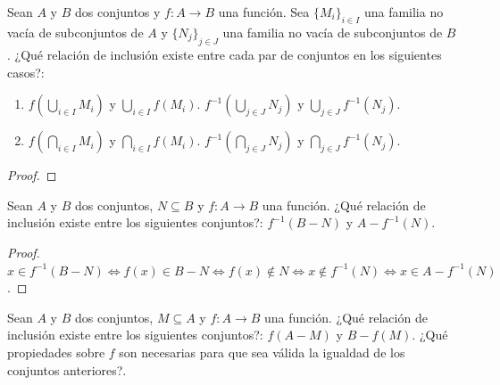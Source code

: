 \documentclass{article}
\theoremstyle{definition}
\newenvironment{ejercicio}[1]{\begin{trivlist}
\item[\hskip \labelsep {\bfseries Ejercicio}\hskip \labelsep {\bfseries #1.}]}{\end{trivlist}}
\begin{document}
\begin{ejercicio}{2}
    Sean \(A\) y \(B\) dos conjuntos y \( f:A\rightarrow B\) una función. Sea \( {\{M_{i}\}}_{i\in I} \) una familia no vacía de subconjuntos de \(A\) y \( {\{N_{j}\}}_{j\in J} \) una familia no vacía de subconjuntos de \(B\). ¿Qué relación de inclusión existe entre cada par de conjuntos en los siguientes casos?:
    \begin{enumerate}
        \item \(f(\bigcup_{i\in I}M_{i})\) y \(\bigcup_{i\in I}f(M_{i})\). \(f^{-1}(\bigcup_{j\in J}N_{j})\) y \(\bigcup_{j\in J}f^{-1}(N_{j})\).
        \item \(f(\bigcap_{i\in I}M_{i})\) y \(\bigcap_{i\in I}f(M_{i})\). \(f^{-1}(\bigcap_{j\in J}N_{j})\) y \(\bigcap_{j\in J}f^{-1}(N_{j})\).
    \end{enumerate}
\end{ejercicio}

\begin{proof}

\end{proof}

\begin{ejercicio}{3}
    Sean \(A\) y \(B\) dos conjuntos, \(N\subseteq B\) y \(f:A\rightarrow B\) una función. ¿Qué relación de inclusión existe entre los siguientes conjuntos?:
    \(f^{-1}(B-N)\) y \(A-f^{-1}(N)\).
\end{ejercicio}

\begin{proof}
    \( x \in f^{-1}(B-N) \iff f(x) \in B-N \iff f(x) \notin N \iff x \notin f^{-1}(N) \iff x \in A - f^{-1}(N) \).
\end{proof}

\begin{ejercicio}{4}
    Sean \(A\) y \(B\) dos conjuntos, \(M\subseteq A\) y \(f:A\rightarrow B\) una función. ¿Qué relación de inclusión existe entre los siguientes conjuntos?:
    \(f(A-M)\) y \(B-f(M)\).
    ¿Qué propiedades sobre \(f\) son necesarias para que sea válida la igualdad de los conjuntos anteriores?.
\end{ejercicio}
\end{document}
